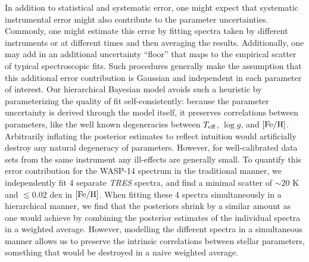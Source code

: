 \documentclass[iop,floatfix]{emulateapj}
\newcommand{\Z}{[{\rm Fe}/{\rm H}]}
\begin{document}
In addition to statistical and systematic error, one might expect that
systematic instrumental error might also contribute to the parameter
uncertainties. Commonly, one might estimate this error by fitting spectra taken
by different instruments or at different times and then averaging the results.
Additionally, one may add in an additional uncertainty ``floor'' that maps to
the empirical scatter of typical spectroscopic fits. Such procedures generally
make the assumption that this additional error contribution is Gaussian and
independent in each parameter of interest. Our hierarchical Bayesian model
avoids such a heuristic by parameterizing the quality of fit self-consistently:
because the parameter uncertainty is derived through the model itself, it
preserves correlations between parameters, like the well known degeneracies
between $T_{\rm eff}$, $\log g$, and $\Z$. Arbitrarily inflating the posterior
estimates to reflect intuition would artificially destroy any natural
degeneracy of parameters. However, for well-calibrated data sets from the same
instrument any ill-effects are generally small. To quantify this error
contribution for the WASP-14 spectrum in the traditional manner, we
independently fit 4 separate \emph{TRES} spectra, and find a minimal scatter of
$\sim20$ K and $\lesssim 0.02$ dex in $\Z$. When fitting these 4 spectra
simultaneously in a hierarchical manner, we find that the posteriors shrink by
a similar amount as one would achieve by combining the posterior estimates of
the individual spectra in a weighted average. However, modelling the different
spectra in a simultaneous manner allows us to preserve the intrinsic
correlations between stellar parameters, something that would be destroyed in a
naive weighted average.
\end{document}
